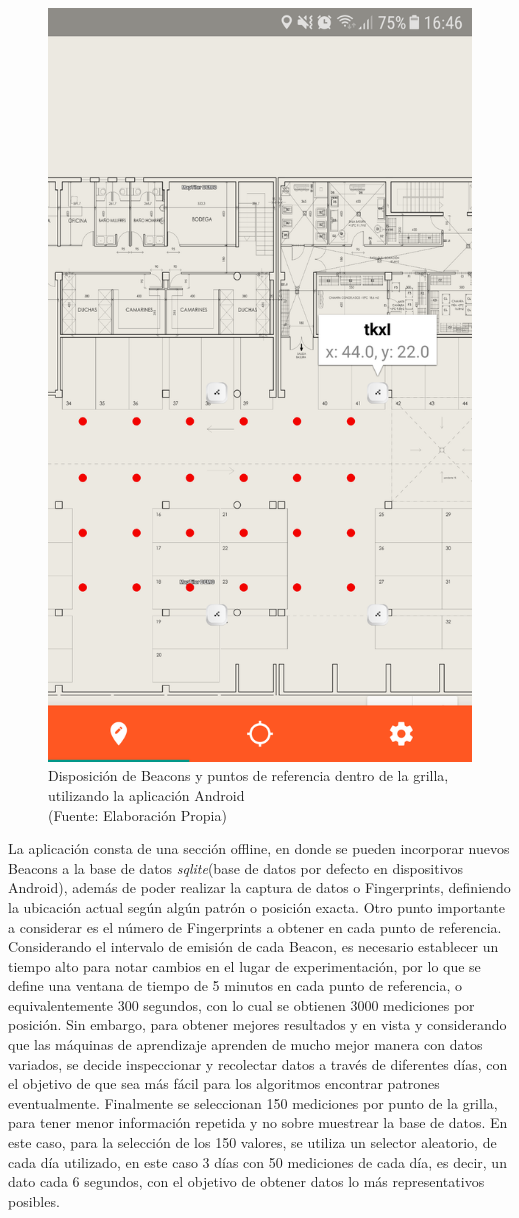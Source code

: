 \begin{figure}[ht!]
\centering
\includegraphics[width=.3\textwidth]{figures/deployBeacons.png}
\caption[Disposición de Beacons y puntos de referencia]{Disposición de Beacons y puntos de referencia dentro de la grilla, utilizando la aplicación Android\\
{\scriptsize (Fuente: Elaboración Propia)}}
\label{fig:deployBeacons}
\end{figure}

La aplicación consta de una sección offline, en donde se pueden incorporar nuevos Beacons a la base de datos \textit{sqlite}(base de datos por defecto en dispositivos Android), además de poder realizar  la captura de datos o Fingerprints, definiendo la ubicación actual según algún patrón o posición exacta. Otro punto importante a considerar es el número de Fingerprints a obtener en cada punto de referencia. Considerando el intervalo de emisión de cada Beacon, es necesario establecer un tiempo alto para notar cambios en el lugar de experimentación, por lo que se define una ventana de tiempo de 5 minutos en cada punto de referencia, o equivalentemente 300 segundos, con lo cual se obtienen 3000 mediciones por posición. Sin embargo, para obtener mejores resultados y en vista y considerando que las máquinas de aprendizaje aprenden de mucho mejor manera con datos variados, se decide inspeccionar y recolectar datos a través de diferentes días, con el objetivo de que sea más fácil para los algoritmos encontrar patrones eventualmente. Finalmente se seleccionan 150 mediciones por punto de la grilla, para tener menor información repetida y no sobre muestrear la base de datos. En este caso, para la selección de los 150 valores, se utiliza un selector aleatorio, de cada día utilizado, en este caso 3 días con 50 mediciones de cada día, es decir, un dato cada 6 segundos, con el objetivo de obtener datos lo más representativos posibles.

